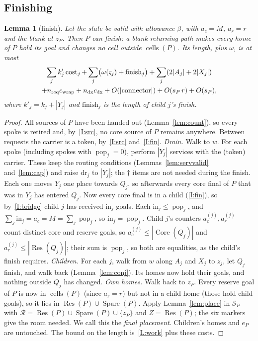 \documentclass[11pt]{amsart}
\newtheorem{lemma}[theorem]{Lemma}
\theoremstyle{definition}
\newcommand{\cells}{\operatorname{cells}}
\newcommand{\Core}{\operatorname{Core}}
\newcommand{\Res}{\operatorname{Res}}
\newcommand{\Spare}{\operatorname{Spare}}
\newcommand{\pop}{\operatorname{pop}}
\newcommand{\cost}{\operatorname{cost}}
\begin{document}
\subsection{Finishing}

\begin{lemma}[finish]\label{lem:finish}
Let the state be valid with allowance $\beta$, with $a_c=M$, $a_r=r$ and the blank at $z_P$. Then $P$ can finish: a blank-returning
path makes every home of $P$ hold its goal and changes no cell outside $\cells(P)$. Its length, plus $\omega$, is at most
\begin{multline*}
\sum_jk'_j\cost_j+\sum_j\bigl(\omega(\varsigma_j)+\text{finish}_j\bigr)+\sum_j(2|A_j|+2|X_j|)\\
+n_{\rm req}c_{\rm wrap}+n_{\rm dx}c_{\rm dx}+O(|\text{connector}|)+O(s_P\,r)+O(s_P),
\end{multline*}
where $k'_j=k_j+|Y_j|$ and $\text{finish}_j$ is the length of child $j$'s finish.
\end{lemma}

\begin{proof}
All sources of $P$ have been handed out (Lemma~\ref{lem:count}), so every spoke is retired and, by~\ref{I:src}, no core source of
$P$ remains anywhere. Between requests the carrier is a token, by~\ref{I:src} and~\ref{I:fin}.
\emph{Drain.} Walk to $w$. For each spoke (including spokes with $\pop_j=0$), perform $|Y_j|$ services with the (token)
carrier. These keep the routing conditions (Lemmas~\ref{lem:servvalid} and~\ref{lem:cap}) and raise $\mathrm{dr}_j$ to $|Y_j|$; the
$\dagger$ items are not needed during the finish. Each one moves $Y_j$ one place towards $Q_j$, so
afterwards every core final of $P$ that was in $Y_j$ has entered $Q_j$. Now every core final is in a child (\ref{I:fin}), so by~\ref{I:bridge}
child $j$ has received $\mathrm{in}_j$ goals. Each $\mathrm{in}_j\le\pop_j$, and $\sum_j\mathrm{in}_j=a_c=M=\sum_j\pop_j$, so
$\mathrm{in}_j=\pop_j$. Child $j$'s counters $a_c^{(j)},a_r^{(j)}$ count distinct core and reserve goals, so $a_c^{(j)}\le|\Core(Q_j)|$ and
$a_r^{(j)}\le|\Res(Q_j)|$; their sum is $\pop_j$, so both are equalities, as the child's finish requires.
\emph{Children.} For each $j$, walk from $w$ along $A_j$ and $X_j$ to $z_j$, let $Q_j$ finish, and walk back (Lemma~\ref{lem:conj}).
Its homes now hold their goals, and nothing outside $Q_j$ has changed.
\emph{Own homes.} Walk back to $z_P$. Every reserve goal of $P$ is now in $\cells(P)$ (since $a_r=r$) but not in a child home (those
hold child goals), so it lies in $\Res(P)\cup\Spare(P)$. Apply Lemma~\ref{lem:place} in $\mathcal S_P$ with $\mathcal R=\Res(P)\cup\Spare(P)\cup\{z_P\}$ and
$Z=\Res(P)$; the six markers give the room needed. We call this the \emph{final placement}. Children's homes and $e_P$ are untouched.
The bound on the length is~\ref{L:work} plus these costs.
\end{proof}
\end{document}
